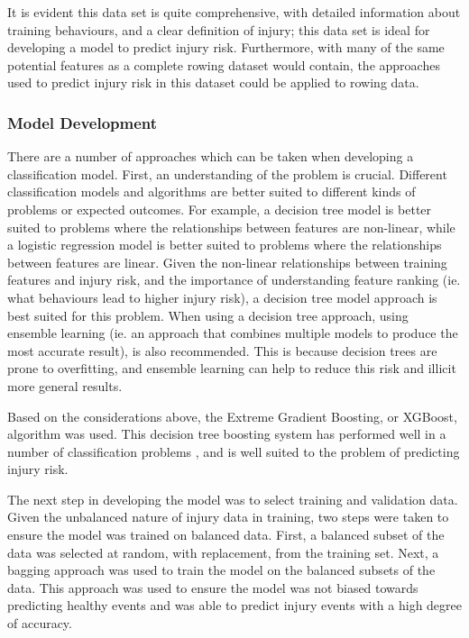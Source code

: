 It is evident this data set is quite comprehensive, with detailed information about training behaviours, and a clear definition of injury; this data set is ideal for developing a model to predict injury risk. Furthermore, with many of the same potential features as a complete rowing dataset would contain, the approaches used to predict injury risk in this dataset could be applied to rowing data.

\subsubsection{Model Development}
There are a number of approaches which can be taken when developing a classification model. First, an understanding of the problem is crucial. Different classification models and algorithms are better suited to different kinds of problems or expected outcomes. For example, a decision tree model is better suited to problems where the relationships between features are non-linear, while a logistic regression model is better suited to problems where the relationships between features are linear. Given the non-linear relationships between training features and injury risk, and the importance of understanding feature ranking (ie. what behaviours lead to higher injury risk), a decision tree model approach is best suited for this problem. When using a decision tree approach, using ensemble learning (ie. an approach that combines multiple models to produce the most accurate result), is also recommended. This is because decision trees are prone to overfitting, and ensemble learning can help to reduce this risk and illicit more general results.

Based on the considerations above, the Extreme Gradient Boosting, or XGBoost, algorithm was used. This decision tree boosting system has performed well in a number of classification problems \cite{Lovdal2021}, and is well suited to the problem of predicting injury risk. 

The next step in developing the model was to select training and validation data. Given the unbalanced nature of injury data in training, two steps were taken to ensure the model was trained on balanced data. First, a balanced subset of the data was selected at random, with replacement, from the training set. Next, a bagging approach was used to train the model on the balanced subsets of the data. This approach was used to ensure the model was not biased towards predicting healthy events and was able to predict injury events with a high degree of accuracy. 


